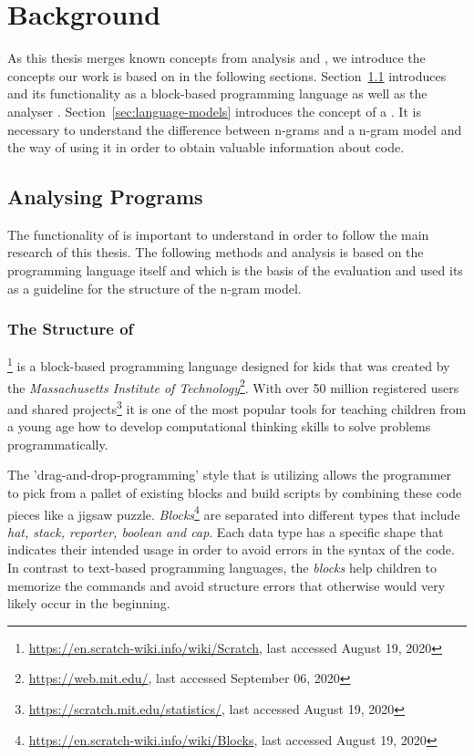 \chapter{Background}\label{chap:background}

As this thesis merges known concepts from \scratch{} analysis and \ngram{}, we introduce the concepts our work is based on in the following sections. Section~\ref{sec:analysing-scratch} introduces \scratch{} and its functionality as a block-based programming language as well as the \scratch{} analyser \litterbox{}. Section~\ref{sec:language-models} introduces the concept of a \ngram{}. It is necessary to understand the difference between n-grams and a n-gram model and the way of using it in order to obtain valuable information about \scratch{} code.


\section{Analysing \scratch{} Programs}\label{sec:analysing-scratch}
The functionality of \scratch{} is important to understand in order to follow the main research of this thesis. The following methods and analysis is based on the programming language \scratch{} itself and \litterbox{} which is the basis of the evaluation and used its \AST{} as a guideline for the structure of the n-gram model. 

\subsection{The Structure of \scratch{}}\label{subsec:scratch}
\scratch{}\footnote{\url{https://en.scratch-wiki.info/wiki/Scratch}, last accessed August 19, 2020} is a block-based programming language designed for kids that was created by the \textit{Massachusetts Institute of Technology}\footnote{\url{https://web.mit.edu/}, last accessed September 06, 2020}. With over 50 million registered users and shared projects\footnote{\url{https://scratch.mit.edu/statistics/}, last accessed August 19, 2020} it is one of the most popular tools for teaching children from a young age how to develop computational thinking skills to solve problems programmatically.

The 'drag-and-drop-programming' style that \scratch{} is utilizing allows the programmer to pick from a pallet of existing blocks and build scripts by combining these code pieces like a jigsaw puzzle.
\textit{Blocks}\footnote{\url{https://en.scratch-wiki.info/wiki/Blocks}, last accessed August 19, 2020} are separated into different types that include \textit{hat, stack, reporter, boolean and cap}. Each data type has a specific shape that indicates their intended usage in order to avoid errors in the syntax of the code. In contrast to text-based programming languages, the \textit{blocks} help children to memorize the commands and avoid structure errors that otherwise would very likely occur in the beginning. 

